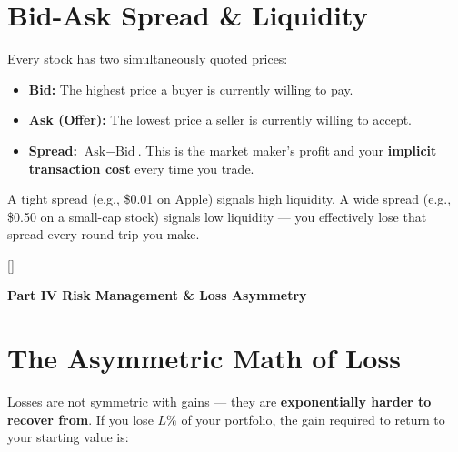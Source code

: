 \documentclass[11pt, letterpaper]{article}
\newcommand{\redsections}{%
  \titleformat{\section}{\large\bfseries\color{sectionred}}{}{0em}{}[\color{sectionred}\titlerule]%
  \titleformat{\subsection}{\normalsize\bfseries\color{sectionred!80!black}}{}{0em}{}%
}
\newcommand{\partbanner}[3]{%
  \begin{tcolorbox}[colback=#1, colframe=#2, boxrule=1.2pt, arc=4pt,
    left=8pt, right=8pt, top=6pt, bottom=6pt]
    \begin{center}{\LARGE\bfseries #3}\end{center}
  \end{tcolorbox}%
}
\begin{document}
\section*{Bid-Ask Spread \& Liquidity}

Every stock has two simultaneously quoted prices:
\begin{itemize}[noitemsep]
  \item \textbf{Bid:} The highest price a buyer is currently willing to pay.
  \item \textbf{Ask (Offer):} The lowest price a seller is currently willing to accept.
  \item \textbf{Spread:} $\text{Ask} - \text{Bid}$. This is the market maker's profit and your \textbf{implicit transaction cost} every time you trade.
\end{itemize}

A tight spread (e.g., \$0.01 on Apple) signals high liquidity. A wide spread (e.g., \$0.50 on a small-cap stock) signals low liquidity --- you effectively lose that spread every round-trip you make.

\newpage

\redsections
{}
\partbanner{part6bg}{sectionred}{Part IV \quad Risk Management \& Loss Asymmetry}

\vspace{8pt}

\section*{The Asymmetric Math of Loss}

Losses are not symmetric with gains --- they are \textbf{exponentially harder to recover from}. If you lose $L\%$ of your portfolio, the gain required to return to your starting value is:
\end{document}
